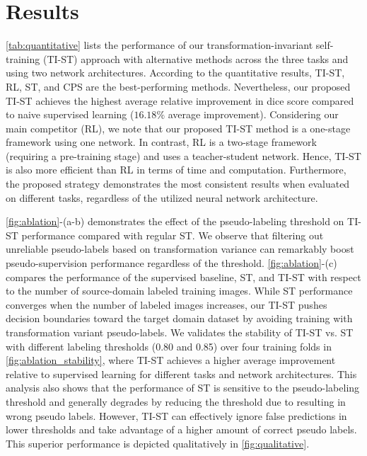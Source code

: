 \section{Results}
\label{sec:experimental_results_tist}



\cref{tab:quantitative} lists the performance of our transformation-invariant self-training (TI-ST) approach with alternative methods across the three tasks and using two network architectures. According to the quantitative results, TI-ST, RL, ST, and CPS are the best-performing methods. Nevertheless, our proposed TI-ST achieves the highest average relative improvement in dice score compared to naive supervised learning ($16.18\%$ average improvement). Considering our main competitor (RL), we note that our proposed TI-ST method is a one-stage framework using one network. In contrast, RL is a two-stage framework (requiring a pre-training stage) and uses a teacher-student network. Hence, TI-ST is also more efficient than RL in terms of time and computation.  Furthermore, the proposed strategy demonstrates the most consistent results when evaluated on different tasks, regardless of the utilized neural network architecture. 


\cref{fig:ablation}-(a-b) demonstrates the effect of the pseudo-labeling threshold on TI-ST performance compared with regular ST. We observe that filtering out unreliable pseudo-labels based on transformation variance can remarkably boost pseudo-supervision performance regardless of the threshold. \cref{fig:ablation}-(c) compares the performance of the supervised baseline, ST, and TI-ST with respect to the number of source-domain labeled training images. While ST performance converges when the number of labeled images increases, our TI-ST pushes decision boundaries toward the target domain dataset by avoiding training with transformation variant pseudo-labels. We validates the stability of TI-ST vs. ST  with different labeling thresholds (0.80 and 0.85) over four training folds in \cref{fig:ablation_stability}, where TI-ST achieves a higher average improvement relative to supervised learning for different tasks and network architectures. This analysis also shows that the performance of ST is sensitive to the pseudo-labeling threshold and generally degrades by reducing the threshold due to resulting in wrong pseudo labels. However, TI-ST can effectively ignore false predictions in lower thresholds and take advantage of a higher amount of correct pseudo labels. This superior performance is depicted qualitatively in \cref{fig:qualitative}.

